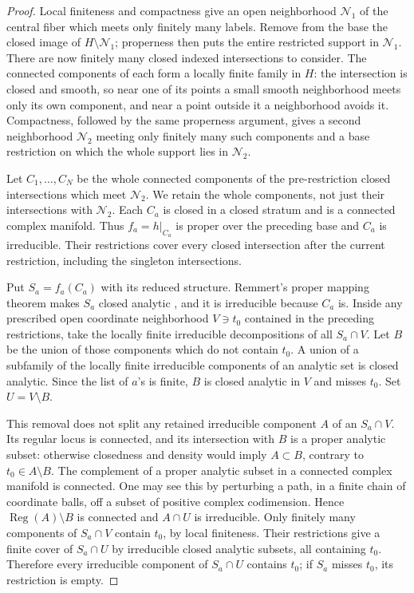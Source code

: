 \begin{proof}
Local finiteness and compactness give an open neighborhood
\(\mathcal N_1\) of the central fiber which meets only finitely many
labels.  Remove from the base the closed image of
\(H\setminus\mathcal N_1\); properness then puts the entire restricted
support in \(\mathcal N_1\).  There are now finitely many closed indexed
intersections to consider.  The connected components of each form a
locally finite family in \(H\): the intersection is closed and smooth,
so near one of its points a small smooth neighborhood meets only its own
component, and near a point outside it a neighborhood avoids it.
Compactness, followed by the same properness argument, gives a second
neighborhood \(\mathcal N_2\) meeting only finitely many such components
and a base restriction on which the whole support lies in
\(\mathcal N_2\).

Let \(C_1,\ldots,C_N\) be the whole connected components of the
pre-restriction closed intersections which meet \(\mathcal N_2\).
We retain the whole components, not just their intersections with
\(\mathcal N_2\).  Each \(C_a\) is closed in a closed stratum and is a
connected complex manifold.  Thus \(f_a=h|_{C_a}\) is proper over the
preceding base and \(C_a\) is irreducible.  Their restrictions cover
every closed intersection after the current restriction, including the
singleton intersections.

Put \(S_a=f_a(C_a)\) with its reduced structure.  Remmert's proper
mapping theorem makes \(S_a\) closed analytic
\cite[Section~7, no.~1, Satz~1, p.~60]{Grauert1960ProperMapping}, and it
is irreducible because \(C_a\) is.  Inside any prescribed open coordinate
neighborhood \(V\ni t_0\) contained in the preceding restrictions,
take the locally finite irreducible decompositions of all \(S_a\cap V\).
Let \(B\) be the union of those components which do not contain \(t_0\).
A union of a subfamily of the locally finite irreducible components of
an analytic set is closed analytic.  Since the list of \(a\)'s is finite,
\(B\) is closed analytic in \(V\) and misses \(t_0\).  Set \(U=V\setminus B\).

This removal does not split any retained irreducible component \(A\) of
an \(S_a\cap V\).  Its regular locus is connected, and its intersection
with \(B\) is a proper analytic subset: otherwise closedness and density
would imply \(A\subset B\), contrary to \(t_0\in A\setminus B\).
The complement of a proper analytic subset in a connected complex
manifold is connected.  One may see this by perturbing a path, in a
finite chain of coordinate balls, off a subset of positive complex
codimension.  Hence \(\operatorname{Reg}(A)\setminus B\) is connected
and \(A\cap U\) is irreducible.  Only finitely many components of
\(S_a\cap V\) contain \(t_0\), by local finiteness.  Their restrictions
give a finite cover of \(S_a\cap U\) by irreducible closed analytic
subsets, all containing \(t_0\).  Therefore every irreducible component
of \(S_a\cap U\) contains \(t_0\); if \(S_a\) misses \(t_0\), its
restriction is empty.


\end{proof}
